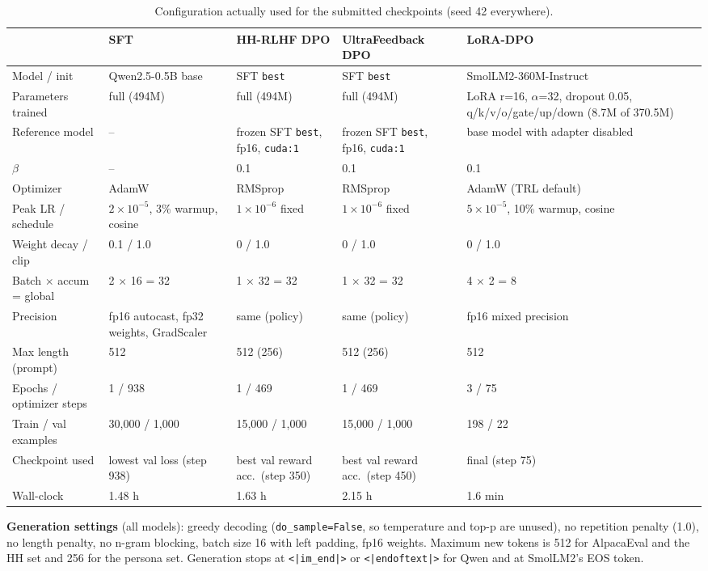 \documentclass[10pt]{article}
\begin{document}
\begin{table}[h]
\centering
\small
\caption{Configuration actually used for the submitted checkpoints (seed 42 everywhere).}
\label{tab:config}
\setlength{\tabcolsep}{3pt}
\begin{tabularx}{\linewidth}{@{}lYYYY@{}}
\toprule
 & \textbf{SFT} & \textbf{HH-RLHF DPO} & \textbf{UltraFeedback DPO} & \textbf{LoRA-DPO} \\
\midrule
Model / init & Qwen2.5-0.5B base & SFT \texttt{best} & SFT \texttt{best} & SmolLM2-360M-Instruct \\
Parameters trained & full (494M) & full (494M) & full (494M) & LoRA r=16, $\alpha$=32, dropout 0.05, q/k/v/o/gate/up/down (8.7M of 370.5M) \\
Reference model & -- & frozen SFT \texttt{best}, fp16, \texttt{cuda:1} & frozen SFT \texttt{best}, fp16, \texttt{cuda:1} & base model with adapter disabled \\
$\beta$ & -- & 0.1 & 0.1 & 0.1 \\
Optimizer & AdamW & RMSprop & RMSprop & AdamW (TRL default) \\
Peak LR / schedule & $2\times10^{-5}$, 3\% warmup, cosine & $1\times10^{-6}$ fixed & $1\times10^{-6}$ fixed & $5\times10^{-5}$, 10\% warmup, cosine \\
Weight decay / clip & 0.1 / 1.0 & 0 / 1.0 & 0 / 1.0 & 0 / 1.0 \\
Batch $\times$ accum = global & 2 $\times$ 16 = 32 & 1 $\times$ 32 = 32 & 1 $\times$ 32 = 32 & 4 $\times$ 2 = 8 \\
Precision & fp16 autocast, fp32 weights, GradScaler & same (policy) & same (policy) & fp16 mixed precision \\
Max length (prompt) & 512 & 512 (256) & 512 (256) & 512 \\
Epochs / optimizer steps & 1 / 938 & 1 / 469 & 1 / 469 & 3 / 75 \\
Train / val examples & 30,000 / 1,000 & 15,000 / 1,000 & 15,000 / 1,000 & 198 / 22 \\
Checkpoint used & lowest val loss (step 938) & best val reward acc.\ (step 350) & best val reward acc.\ (step 450) & final (step 75) \\
Wall-clock & 1.48 h & 1.63 h & 2.15 h & 1.6 min \\
\bottomrule
\end{tabularx}
\end{table}

\textbf{Generation settings} (all models): greedy decoding (\texttt{do\_sample=False}, so temperature and top-p are unused), no repetition penalty (1.0), no length penalty, no n-gram blocking, batch size 16 with left padding, fp16 weights. Maximum new tokens is 512 for AlpacaEval and the HH set and 256 for the persona set. Generation stops at \texttt{<|im\_end|>} or \texttt{<|endoftext|>} for Qwen and at SmolLM2's EOS token.
\end{document}
